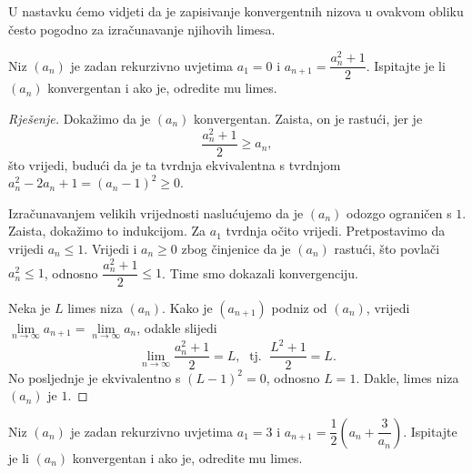 U nastavku ćemo vidjeti da je zapisivanje konvergentnih nizova u ovakvom obliku često pogodno za izračunavanje njihovih limesa.
\begin{exercise}
Niz $(a_n)$ je zadan rekurzivno uvjetima $a_1=0$ i $a_{n+1}=\dfrac{a_n^2+1}{2}$. Ispitajte je li $(a_n)$ konvergentan i ako je, odredite mu limes.
\end{exercise}
\begin{proof}[Rješenje]
Dokažimo da je $(a_n)$ konvergentan. Zaista, on je rastući, jer je 
$$\dfrac{a_n^2+1}{2}\geq a_n,$$
što vrijedi, budući da je ta tvrdnja ekvivalentna s tvrdnjom $a_n^2-2a_n+1=(a_n-1)^2\geq 0$. 

Izračunavanjem velikih vrijednosti naslućujemo da je $(a_n)$ odozgo ograničen s $1$. Zaista, dokažimo to indukcijom. Za $a_1$ tvrdnja očito vrijedi. Pretpostavimo da vrijedi $a_n\leq 1$. Vrijedi i $a_n\geq 0$ zbog činjenice da je $(a_n)$ rastući, što povlači $a_n^2\leq 1$, odnosno $\dfrac{a_n^2+1}{2}\leq 1$. Time smo dokazali konvergenciju. 

Neka je $L$ limes niza $(a_n)$. Kako je $(a_{n+1})$ podniz od $(a_n)$, vrijedi $\lim\limits_{n\to \infty}{a_{n+1}}=\lim\limits_{n\to \infty}{a_n}$, odakle slijedi
$$\lim\limits_{n\to \infty}{\dfrac{a_n^2+1}{2}}=L,\;\text{ tj. }\; \dfrac{L^2+1}{2}=L.$$
No posljednje je ekvivalentno s $(L-1)^2=0$, odnosno $L=1$. Dakle, limes niza $(a_n)$ je $1$.
\end{proof}
\begin{exercise}
Niz $(a_n)$ je zadan rekurzivno uvjetima $a_1=3$ i $a_{n+1}=\dfrac{1}{2}\left(a_n+\dfrac{3}{a_n}\right)$. Ispitajte je li $(a_n)$ konvergentan i ako je, odredite mu limes.
\end{exercise}
